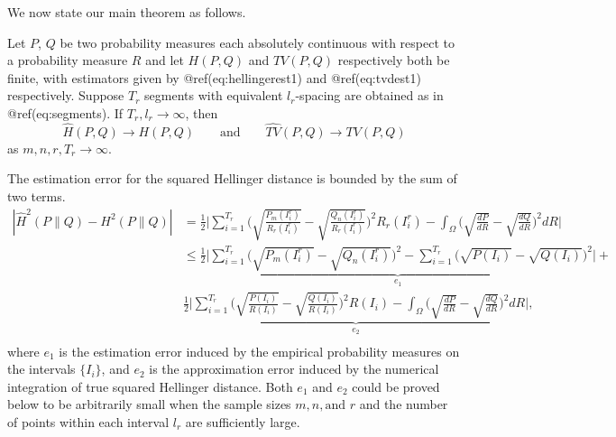 \documentclass{article}
\begin{document}
We now state our main theorem as follows.

\leavevmode{}%
Let \(P\), \(Q\) be two probability measures each absolutely continuous
with respect to a probability measure \(R\) and let \(H(P,Q)\) and
\(TV(P,Q)\) respectively both be finite, with estimators given by
@ref(eq:hellingerest1) and @ref(eq:tvdest1) respectively. Suppose
\(T_r\) segments with equivalent \(l_r\)-spacing are obtained as in
@ref(eq:segments). If \(T_r, l_r \rightarrow \infty\), then
\begin{equation}
 \hat{H}(P , Q) \rightarrow H(P, Q)
 \qquad \text{and} \qquad
 \hat{TV}(P , Q) \rightarrow TV(P , Q)
\end{equation} as \(m, n,r,T_r \rightarrow \infty\).

The estimation error for the squared Hellinger distance is bounded by
the sum of two terms. \begin{equation}\label{eq:errors}
\begin{aligned}
|\hat{H}^2(P \| Q) - H^2(P \| Q)| &= \frac{1}{2} \bigg| \sum_{i=1}^{T_r} \bigg( \sqrt{\frac{P_m(I_i^r)}{R_r(I_i^r)}} - \sqrt{\frac{Q_n(I_i^r)}{R_r(I_i^r)}} \bigg)^2 R_r(I_i^r) - \int_\Omega \bigg(\sqrt{\frac{dP}{dR}} - \sqrt{\frac{dQ}{dR}} \bigg)^2 dR \bigg| \\
&\leq  \underbrace{\frac{1}{2} \bigg| \sum_{i=1}^{T_r} \bigg( \sqrt{P_m(I_i^r)} - \sqrt{Q_n(I_i^r)} \bigg)^2 -
\sum_{i=1}^{T_r} \bigg( \sqrt{P(I_i)} - \sqrt{Q(I_i)} \bigg)^2 \bigg|}_{e_1} + \\
& \underbrace{\frac{1}{2} \bigg| \sum_{i=1}^{T_r} \bigg(\sqrt{\frac{P(I_i)}{R(I_i)}} - \sqrt{\frac{Q(I_i)}{R(I_i)}} \bigg)^2 R(I_i) - \int_\Omega \bigg(\sqrt{\frac{dP}{dR}} - \sqrt{\frac{dQ}{dR}} \bigg)^2 dR \bigg|}_{e_2}, \\
\end{aligned}
\end{equation} where \(e_1\) is the estimation error induced by the
empirical probability measures on the intervals \(\{I_i\}\), and \(e_2\)
is the approximation error induced by the numerical integration of true
squared Hellinger distance. Both \(e_1\) and \(e_2\) could be proved
below to be arbitrarily small when the sample sizes
\(m, n, \text{and } r\) and the number of points within each interval
\(l_r\) are sufficiently large.
\end{document}
